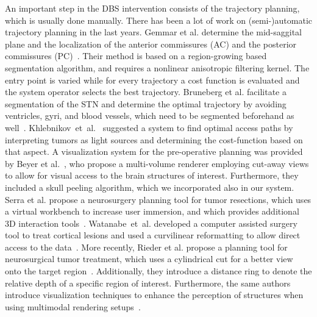\documentclass{vgtc}                          %
\begin{document}

An important step in the DBS intervention consists of the trajectory planning, which is usually done manually. There has been a lot of work on (semi-)automatic trajectory planning in the last years. Gemmar et al. determine the mid-saggital plane and the localization of the anterior commissures (AC) and the posterior commissures (PC)~\cite{Gemmar2008}. Their method is based on a region-growing based segmentation algorithm, and requires a nonlinear anisotropic filtering kernel. The entry point is varied while for every trajectory a cost function is evaluated and the system operator selects the best trajectory. Bruneberg et al. facilitate a segmentation of the STN and determine the optimal trajectory by avoiding ventricles, gyri, and blood vessels, which need to be segmented beforehand as well~\cite{Brunenberg2007}. Khlebnikov~et~al.~\cite{Khlebnikov2011} suggested a system to find optimal access paths by interpreting tumors as light sources and determining the cost-function based on that aspect. A visualization system for the pre-operative planning was provided by Beyer et al.~\cite{Beyer2007}, who propose a multi-volume renderer employing cut-away views to allow for visual access to the brain structures of interest. Furthermore, they included a skull peeling algorithm, which we incorporated also in our system. Serra et al. propose a neurosurgery planning tool for tumor resections, which uses a virtual workbench to increase user immersion, and which provides additional 3D interaction tools~\cite{Serra1998}. Watanabe~et~al. developed a computer assisted surgery tool to treat cortical lesions and used a curvilinear reformatting to allow direct access to the data~\cite{Watanabe}.  More recently, Rieder et al. propose a planning tool for neurosurgical tumor treatment, which uses a cylindrical cut for a better view onto the target region~\cite{Rieder2008}. Additionally, they introduce a distance ring to denote the relative depth of a specific region of interest. Furthermore, the same authors introduce visualization techniques to enhance the perception of structures when using multimodal rendering setups~\cite{Rieder2008a}.
\end{document}
